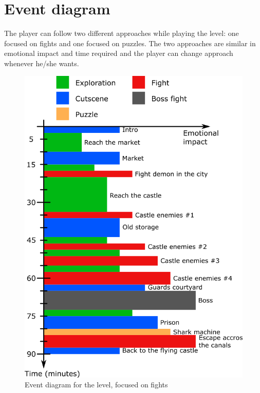 \section{Event diagram}

The player can follow two different approaches while playing the level: one focused on fights and one focused on puzzles. The two approaches are similar in emotional impact and time required and the player can change approach whenever he/she wants.

\begin{figure}[H]
  \centering
  \includegraphics[width=12cm]{../Images/Diagrams/eventDiagramFights}
  \caption{Event diagram for the level, focused on fights}
\end{figure}


